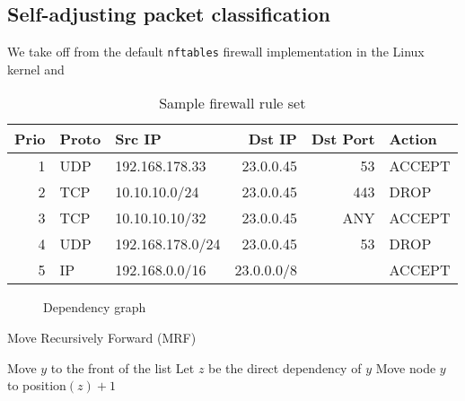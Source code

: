 \subsection{Self-adjusting packet classification}
\label{sec:sa-pack-class}

We take off from the default \texttt{nftables} firewall implementation in the Linux kernel and 

\begin{table}[t]
  \centering
  \begin{small}
    \renewcommand{\tabcolsep}{2pt}
    \begin{tabular}{r|l|l|r|r|l}
      \textbf{Prio} & \textbf{Proto} & \textbf{Src IP} & \textbf{Dst IP} & \textbf{Dst Port} & \textbf{Action}\\
      \hline
      1 & UDP & 192.168.178.33 & 23.0.0.45 & 53 & ACCEPT\\
      2 & TCP & 10.10.10.0/24 & 23.0.0.45 & 443 & DROP\\
      3 & TCP & 10.10.10.10/32 & 23.0.0.45 & ANY & ACCEPT\\
      4 & UDP & 192.168.178.0/24 & 23.0.0.45 & 53 & DROP\\
      5 & IP & 192.168.0.0/16 & 23.0.0.0/8 &  & ACCEPT\\
    \end{tabular}
  \end{small}%
  \caption{Sample firewall rule set}
  \label{fig:class-sample}
\end{table}

\begin{figure}[t]
  \centering
  \begin{small}
  \end{small}
  \caption{Dependency graph}%
  \label{fig:class-dep}
\end{figure}

\begin{algorithm}
  \caption{Move Recursively Forward (MRF)}
  \label{alg:alg}
  \begin{small}
    \begin{algorithmic}[1]
      \State Move $y$ to the front of the list
      \Else
      \State Let $z$ be the direct dependency of $y$
      \State Move node $y$ to position$(z) + 1$
      \State {}
      \EndIf
      \EndProcedure
    \end{algorithmic}
  \end{small}
\end{algorithm}

